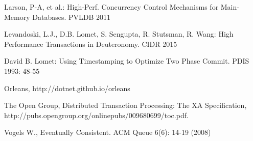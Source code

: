 \documentclass[11pt]{article}
\begin{document}
\begin{thebibliography}{10}
\begin{small}
Larson, P-A, et al.: High-Perf. Concurrency Control Mechanisms for Main-Memory Databases. PVLDB 2011 

Levandoski, L.J., D.B. Lomet, S. Sengupta, R. Stutsman, R. Wang: High Performance Transactions in Deuteronomy. CIDR 2015 

David B. Lomet: Using Timestamping to Optimize Two Phase Commit. PDIS 1993: 48-55 

Orleans, http://dotnet.github.io/orleans 

The Open Group, Distributed Transaction Processing: The XA Specification, http://pubs.opengroup.org/onlinepubs/009680699/toc.pdf. 

Vogels W., Eventually Consistent. ACM Queue 6(6): 14-19 (2008) \end{small}
\end{thebibliography}
\end{document}
